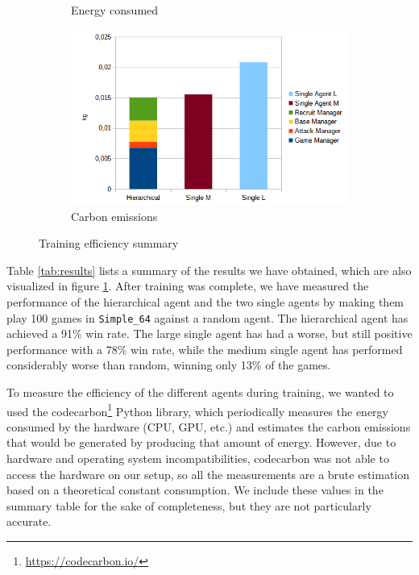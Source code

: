 \begin{figure}[t]
\begin{subfigure}[b]{0.495\textwidth}
        \caption{Energy consumed}
    \end{subfigure}
    \begin{subfigure}[b]{0.495\textwidth}
        \includegraphics[width=1\textwidth]{figs/training_emissions.png}
        \caption{Carbon emissions}
    \end{subfigure}
    \caption{Training efficiency summary}
    \label{fig:results}
\end{figure}

Table \ref{tab:results} lists a summary of the results we have obtained, which are also visualized in figure \ref{fig:results}. After training was complete, we have measured the performance of the hierarchical agent and the two single agents by making them play 100 games in \texttt{Simple\_64} against a random agent. The hierarchical agent has achieved a 91\% win rate. The large single agent has had a worse, but still positive performance with a 78\% win rate, while the medium single agent has performed considerably worse than random, winning only 13\% of the games.

To measure the efficiency of the different agents during training, we wanted to used the codecarbon\footnote{\url{https://codecarbon.io/}} Python library, which periodically measures the energy consumed by the hardware (CPU, GPU, etc.) and estimates the carbon emissions that would be generated by producing that amount of energy. However, due to hardware and operating system incompatibilities, codecarbon was not able to access the hardware on our setup, so all the measurements are a brute estimation based on a theoretical constant consumption. We include these values in the summary table for the sake of completeness, but they are not particularly accurate.

